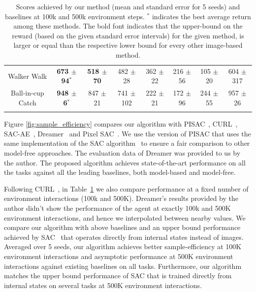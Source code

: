 \documentclass[a4paper,12pt]{article}
\begin{document}
\begin{table}[b!]
\begin{center}
{\begin{tabular}{c | c c c c c c | c}
    Walker Walk & \bfseries 673 $\pm$ \bfseries 94$^\ast$ & \bfseries 518 $\pm$ \bfseries 70 &  482 $\pm$  28 & 362 $\pm$ 22 & 216 $\pm$ 56 & 105 $\pm$ 20 & 604 $\pm$ 317 \\
    Ball-in-cup Catch & \bfseries 948 $\pm$ \bfseries 6$^\ast$ & 847 $\pm$ 21 & 741 $\pm$  102 & 222 $\pm$ 21 & 172 $\pm$ 96 & 244 $\pm$ 55 & 957 $\pm$ 26\\
    \Xhline{2\arrayrulewidth}
\end{tabular}}
\end{center}
\caption{Scores achieved by our method (mean and standard error for 5 seeds) and baselines at 100k and 500k environment steps. $^\ast$ indicates the best average return among these methods. The bold font indicates that the upper-bound on the reward (based on the given standard error intervals) for the given method, is larger or equal than the respective lower bound for every other image-based method.}
\label{table:sample efficiency}
\end{table}


Figure \ref{fig:sample_efficiency} compares our algorithm with PISAC~\cite{lee2020predictive}, CURL~\cite{laskin2020curl}, SAC-AE~\cite{yarats2019improving}, Dreamer~\cite{hafner2020Dream} and Pixel SAC~\cite{haarnoja2018soft}. We use the version of PISAC that uses the same implementation of the SAC algorithm~\cite{yarats2019improving} to ensure a fair comparison to other model-free approaches. The evaluation data of Dreamer was provided to us by the author. The proposed algorithm achieves state-of-the-art performance on all the tasks against all the leading baselines, both model-based and model-free. 

Following CURL~\cite{laskin2020curl}, in Table~\ref{table:sample efficiency} we also compare performance at a fixed number of environment interactions (100k and 500K). Dreamer's results provided by the author didn't show the performance of the agent at exactly 100k and 500K environment interactions, and hence we interpolated between nearby values. We compare our algorithm with above baselines and an upper bound performance achieved by SAC~\cite{haarnoja2018soft} that operates directly from internal states instead of images. Averaged over 5 seeds, our algorithm achieves better sample-efficiency at 100K environment interactions and asymptotic performance at 500K environment interactions against existing baselines on all tasks. Furthermore, our algorithm matches the upper bound performance of SAC that is trained directly from internal states on several tasks at 500K environment interactions.
\end{document}
